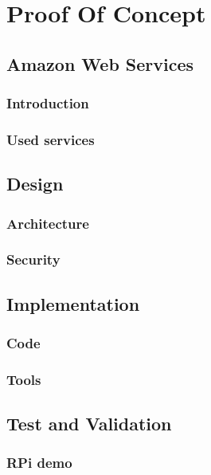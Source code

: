 

\chapter{Proof Of Concept} \label{ch:proofOfConcept}

\section{Amazon Web Services}
\subsection{Introduction}
\subsection{Used services}

\section{Design}
\subsection{Architecture}
\subsection{Security}

\section{Implementation}
\subsection{Code}
\subsection{Tools}

\section{Test and Validation}
\subsection{RPi demo}
